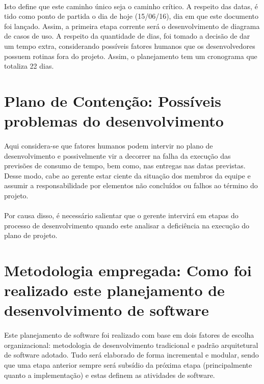 \documentclass[12pt,a4paper]{article}
\begin{document}
		\paragraph{}Isto define que este caminho único seja o caminho crítico. A respeito das datas, é tido como ponto de partida o dia de hoje (15/06/16), dia em que este documento foi lançado. Assim, a primeira etapa corrente será o desenvolvimento de diagrama de casos de uso. A respeito da quantidade de dias, foi tomado a decisão de dar um tempo extra, considerando possíveis fatores humanos que os desenvolvedores possuem rotinas fora do projeto.  Assim, o planejamento tem um cronograma que totaliza 22 dias. 
		\section{Plano de Contenção: Possíveis problemas do desenvolvimento}
		\paragraph{} Aqui considera-se que fatores humanos podem intervir no plano de desenvolvimento e possivelmente vir a decorrer na falha da execução das previsões de consumo de tempo, bem como, nas entregas nas datas previstas. Desse modo, cabe ao gerente estar ciente da situação dos membros da equipe e assumir a responsabilidade por elementos não concluídos ou falhos ao término do projeto. 
		\paragraph{} Por causa disso, é necessário salientar que o gerente intervirá em etapas do processo de desenvolvimento quando este analisar a deficiência na execução do plano de projeto.
		\section{Metodologia empregada: Como foi realizado este planejamento de desenvolvimento de software}
		\paragraph{}Este planejamento de software foi realizado com base em dois fatores de escolha organizacional: metodologia de desenvolvimento tradicional  e padrão arquitetural de software adotado. Tudo será elaborado de forma incremental e modular, sendo que uma etapa anterior sempre será subsídio da próxima etapa (principalmente quanto a implementação) e estas definem as atividades de software.
		
\end{document}
